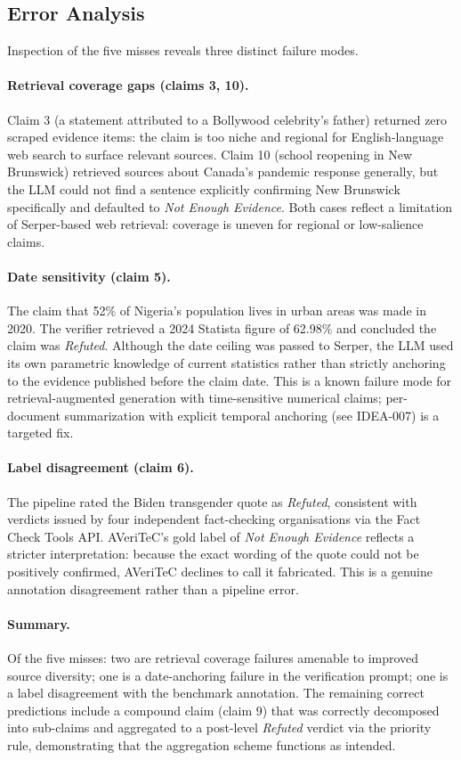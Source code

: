 \subsection{Error Analysis}

Inspection of the five misses reveals three distinct failure modes.

\paragraph{Retrieval coverage gaps (claims 3, 10).}
Claim 3 (a statement attributed to a Bollywood celebrity's father) returned zero scraped evidence items: the claim is too niche and regional for English-language web search to surface relevant sources. Claim 10 (school reopening in New Brunswick) retrieved sources about Canada's pandemic response generally, but the LLM could not find a sentence explicitly confirming New Brunswick specifically and defaulted to \emph{Not Enough Evidence}. Both cases reflect a limitation of Serper-based web retrieval: coverage is uneven for regional or low-salience claims.

\paragraph{Date sensitivity (claim 5).}
The claim that 52\% of Nigeria's population lives in urban areas was made in 2020. The verifier retrieved a 2024 Statista figure of 62.98\% and concluded the claim was \emph{Refuted}. Although the date ceiling was passed to Serper, the LLM used its own parametric knowledge of current statistics rather than strictly anchoring to the evidence published before the claim date. This is a known failure mode for retrieval-augmented generation with time-sensitive numerical claims; per-document summarization with explicit temporal anchoring (see IDEA-007) is a targeted fix.

\paragraph{Label disagreement (claim 6).}
The pipeline rated the Biden transgender quote as \emph{Refuted}, consistent with verdicts issued by four independent fact-checking organisations via the Fact Check Tools API. AVeriTeC's gold label of \emph{Not Enough Evidence} reflects a stricter interpretation: because the exact wording of the quote could not be positively confirmed, AVeriTeC declines to call it fabricated. This is a genuine annotation disagreement rather than a pipeline error.

\paragraph{Summary.}
Of the five misses: two are retrieval coverage failures amenable to improved source diversity; one is a date-anchoring failure in the verification prompt; one is a label disagreement with the benchmark annotation. The remaining correct predictions include a compound claim (claim 9) that was correctly decomposed into sub-claims and aggregated to a post-level \emph{Refuted} verdict via the priority rule, demonstrating that the aggregation scheme functions as intended.
